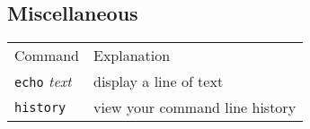 \subsection{Miscellaneous}
\begin{tabular}{ll}
  Command & Explanation \\
  \hhline{==}
  \texttt{echo} \textit{text} & display a line of text \\
  \texttt{history} & view your command line history \\
\end{tabular}  

